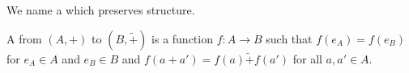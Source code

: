 
\sbasic














\sstart
{}


We name a  which
preserves  structure.



A  from
 $(A, +)$ to
 $(B, \tilde{+})$
is a function $f: A \to B$ such that
$f(e_A) = f(e_B)$ for  $e_A \in A$
and $e_B \in B$ and $f(a + a') = f(a) \tilde{+} f(a')$
for all $a, a' \in A$.


\strats
